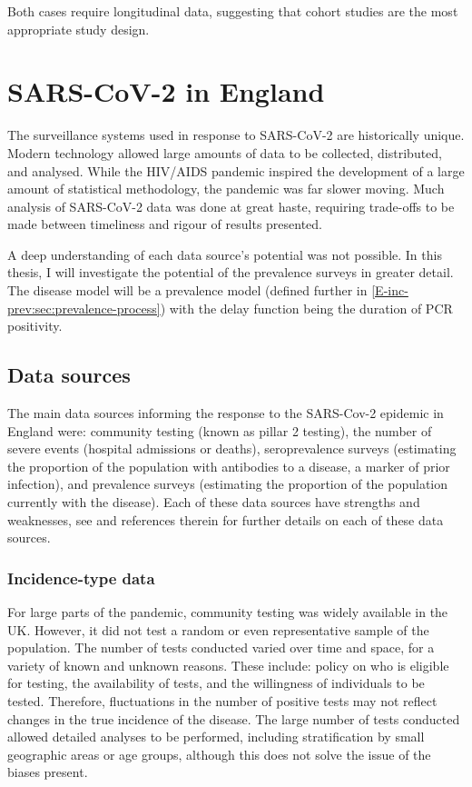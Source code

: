 \documentclass[thesis.tex]{subfiles}
\begin{document}
Both cases require longitudinal data, suggesting that cohort studies are the most appropriate study design.

\section{SARS-CoV-2 in England}

The surveillance systems used in response to SARS-CoV-2 are historically unique.
Modern technology allowed large amounts of data to be collected, distributed, and analysed.
While the HIV/AIDS pandemic inspired the development of a large amount of statistical methodology, the pandemic was far slower moving.
Much analysis of SARS-CoV-2 data was done at great haste, requiring trade-offs to be made between timeliness and rigour of results presented.

A deep understanding of each data source's potential was not possible.
In this thesis, I will investigate the potential of the prevalence surveys in greater detail.
The disease model will be a prevalence model (defined further in \cref{E-inc-prev:sec:prevalence-process}) with the delay function being the duration of PCR positivity.

\subsection{Data sources} \label{intro:sec:data-for-estimating}

The main data sources informing the response to the SARS-Cov-2 epidemic in England were: community testing (known as pillar 2 testing), the number of severe events (\eg hospital admissions or deaths), seroprevalence surveys (estimating the proportion of the population with antibodies to a disease, a marker of prior infection), and prevalence surveys (estimating the proportion of the population currently with the disease).
Each of these data sources have strengths and weaknesses, see \textcite{royalSocietyRnumber} and references therein for further details on each of these data sources.

\subsubsection{Incidence-type data}

For large parts of the pandemic, community testing was widely available in the UK.
However, it did not test a random or even representative sample of the population.
The number of tests conducted varied over time and space, for a variety of known and unknown reasons.
These include: policy on who is eligible for testing, the availability of tests, and the willingness of individuals to be tested.
Therefore, fluctuations in the number of positive tests may not reflect changes in the true incidence of the disease.
The large number of tests conducted allowed detailed analyses to be performed, including stratification by small geographic areas or age groups, although this does not solve the issue of the biases present.
\end{document}
